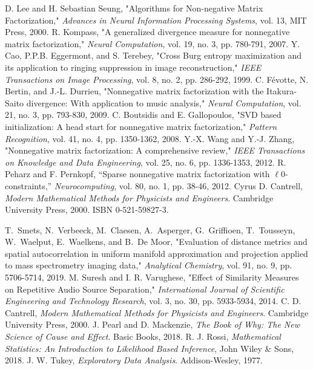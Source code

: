\documentclass[lettersize,journal]{IEEEtran}
\begin{document}
\begin{thebibliography}{1}
D. Lee and H. Sebastian Seung, "Algorithms for Non-negative Matrix Factorization," \emph{Advances in Neural Information Processing Systems}, vol. 13, MIT Press, 2000. 
R. Kompass, "A generalized divergence measure for nonnegative matrix factorization," \emph{Neural Computation}, vol. 19, no. 3, pp. 780-791, 2007.
Y. Cao, P.P.B. Eggermont, and S. Terebey, "Cross Burg entropy maximization and its application to ringing suppression in image reconstruction," \emph{IEEE Transactions on Image Processing}, vol. 8, no. 2, pp. 286-292, 1999.
C. Févotte, N. Bertin, and J.-L. Durrieu, "Nonnegative matrix factorization with the Itakura-Saito divergence: With application to music analysis," \emph{Neural Computation}, vol. 21, no. 3, pp. 793-830, 2009.
C. Boutsidis and E. Gallopoulos, "SVD based initialization: A head start for nonnegative matrix factorization," \emph{Pattern Recognition}, vol. 41, no. 4, pp. 1350-1362, 2008.
Y.-X. Wang and Y.-J. Zhang, "Nonnegative matrix factorization: A comprehensive review," \emph{IEEE Transactions on Knowledge and Data Engineering}, vol. 25, no. 6, pp. 1336-1353, 2012.
R. Peharz and F. Pernkopf, ``Sparse nonnegative matrix factorization with $\ell$0-constraints,'' \textit{Neurocomputing}, vol. 80, no. 1, pp. 38-46, 2012.
Cyrus D. Cantrell, \textit{Modern Mathematical Methods for Physicists and Engineers}. Cambridge University Press, 2000. ISBN 0-521-59827-3.

T.~Smets, N.~Verbeeck, M.~Claesen, A.~Asperger, G.~Griffioen, T.~Tousseyn, W.~Waelput, E.~Waelkens, and B.~De Moor, "Evaluation of distance metrics and spatial autocorrelation in uniform manifold approximation and projection applied to mass spectrometry imaging data," \textit{Analytical Chemistry}, vol. 91, no. 9, pp. 5706-5714, 2019.
M. Suresh and I. R. Varughese, "Effect of Similarity Measures on Repetitive Audio Source Separation," \textit{International Journal of Scientific Engineering and Technology Research}, vol. 3, no. 30, pp. 5933-5934, 2014.
C. D. Cantrell, \textit{Modern Mathematical Methods for Physicists and Engineers}. Cambridge University Press, 2000.
J. Pearl and D. Mackenzie, \emph{The Book of Why: The New Science of Cause and Effect}. Basic Books, 2018.
R. J. Rossi, \emph{Mathematical Statistics: An Introduction to Likelihood Based Inference}, John Wiley \& Sons, 2018.
J. W. Tukey, \emph{Exploratory Data Analysis}. Addison-Wesley, 1977.




\end{thebibliography}
\vfill
\end{document}
